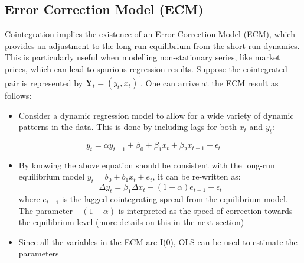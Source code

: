 \documentclass[11pt]{article}
\providecommand{\tightlist}{%
      \setlength{\itemsep}{0pt}\setlength{\parskip}{0pt}}
\begin{document}
    \subsection{Error Correction Model
(ECM)}\label{error-correction-model-ecm}
Cointegration implies the existence of an Error Correction Model (ECM),
which provides an adjustment to the long-run equilibrium from the
short-run dynamics. This is particularly useful when modelling
non-stationary series, like market prices, which can lead to spurious
regression results.
Suppose the cointegrated pair is represented by $\mathbf{Y}_t = (y_t,
x_t)^{\prime} $. One can arrive at the ECM result as follows:
\begin{itemize}
\tightlist
\item
  Consider a dynamic regression model to allow for a wide variety of
  dynamic patterns in the data. This is done by including lags for both
  \(x_t\) and \(y_t\):
\end{itemize}
\begin{equation}
y_t = \alpha y_{t-1} +  \beta_0 + \beta_1 x_t + \beta_2 x_{t-1} + \epsilon_t
\end{equation}
\begin{itemize}
\item
  By knowing the above equation should be consistent with the long-run
  equilibrium model \(y_t = b_0 + b_1 x_t + e_t\), it can be re-written
  as:
  \begin{equation}
  \Delta y_{t} = \beta_1 \Delta x_t - (1- \alpha) e_{t-1} + \epsilon_t
  \end{equation}
  where \(e_{t-1}\) is the lagged cointegrating spread from the
  equilibrium model. The parameter \(-(1-\alpha)\) is interpreted as the
  speed of correction towards the equilibrium level (more details on this in the next
  section)
\item
  Since all the variables in the ECM are I(0), OLS can be used to
  estimate the parameters
\end{itemize}
\end{document}
